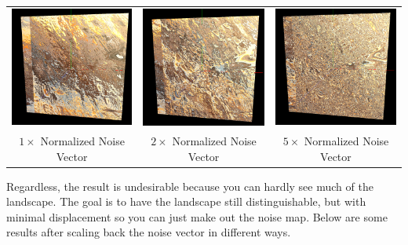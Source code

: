 \documentclass[twoside,11pt]{article}
\theoremstyle{definition}
\begin{document}
\begin{center}\begin{tabular}{ccc}
	\includegraphics[width=.3\textwidth]{1x_normal_noise} &
	\includegraphics[width=.3\textwidth]{2x_normal_noise} &
	\includegraphics[width=.3\textwidth]{5x_normal_noise}\\
	$1\times$ Normalized Noise Vector & $2\times$ Normalized Noise Vector & $5\times$ Normalized Noise Vector
\end{tabular}\end{center}

Regardless, the result is undesirable because you can hardly see much of the landscape. The goal is to have the landscape still distinguishable, but with minimal displacement so you can just make out the noise map. Below are some results after scaling back the noise vector in different ways.
\end{document}

